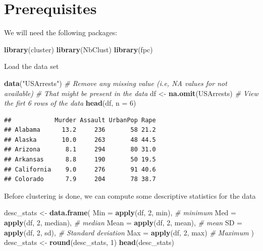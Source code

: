 \documentclass[
]{book}
\newenvironment{Shaded}{\begin{snugshade}}{\end{snugshade}}
\newcommand{\CommentTok}[1]{\textcolor[rgb]{0.56,0.35,0.01}{\textit{#1}}}
\newcommand{\DataTypeTok}[1]{\textcolor[rgb]{0.13,0.29,0.53}{#1}}
\newcommand{\DecValTok}[1]{\textcolor[rgb]{0.00,0.00,0.81}{#1}}
\newcommand{\KeywordTok}[1]{\textcolor[rgb]{0.13,0.29,0.53}{\textbf{#1}}}
\newcommand{\NormalTok}[1]{#1}
\newcommand{\StringTok}[1]{\textcolor[rgb]{0.31,0.60,0.02}{#1}}
\begin{document}
\hypertarget{prerequisites}{%
\section{Prerequisites}\label{prerequisites}}

We will need the following packages:

\begin{Shaded}
\begin{Highlighting}[]
\KeywordTok{library}\NormalTok{(cluster)}
\KeywordTok{library}\NormalTok{(NbClust)}
\KeywordTok{library}\NormalTok{(fpc)}
\end{Highlighting}
\end{Shaded}

Load the data set

\begin{Shaded}
\begin{Highlighting}[]
\KeywordTok{data}\NormalTok{(}\StringTok{"USArrests"}\NormalTok{)}
\CommentTok{# Remove any missing value (i.e, NA values for not available)}
\CommentTok{# That might be present in the data}
\NormalTok{df <-}\StringTok{ }\KeywordTok{na.omit}\NormalTok{(USArrests)}
\CommentTok{# View the firt 6 rows of the data}
\KeywordTok{head}\NormalTok{(df, }\DataTypeTok{n =} \DecValTok{6}\NormalTok{)}
\end{Highlighting}
\end{Shaded}

\begin{verbatim}
##            Murder Assault UrbanPop Rape
## Alabama      13.2     236       58 21.2
## Alaska       10.0     263       48 44.5
## Arizona       8.1     294       80 31.0
## Arkansas      8.8     190       50 19.5
## California    9.0     276       91 40.6
## Colorado      7.9     204       78 38.7
\end{verbatim}

Before clustering is done, we can compute some descriptive statistics for the data

\begin{Shaded}
\begin{Highlighting}[]
\NormalTok{desc_stats <-}\StringTok{ }\KeywordTok{data.frame}\NormalTok{(}
\DataTypeTok{Min =} \KeywordTok{apply}\NormalTok{(df, }\DecValTok{2}\NormalTok{, min), }\CommentTok{# minimum}
\DataTypeTok{Med =} \KeywordTok{apply}\NormalTok{(df, }\DecValTok{2}\NormalTok{, median), }\CommentTok{# median}
\DataTypeTok{Mean =} \KeywordTok{apply}\NormalTok{(df, }\DecValTok{2}\NormalTok{, mean), }\CommentTok{# mean}
\DataTypeTok{SD =} \KeywordTok{apply}\NormalTok{(df, }\DecValTok{2}\NormalTok{, sd), }\CommentTok{# Standard deviation}
\DataTypeTok{Max =} \KeywordTok{apply}\NormalTok{(df, }\DecValTok{2}\NormalTok{, max) }\CommentTok{# Maximum}
\NormalTok{)}
\NormalTok{desc_stats <-}\StringTok{ }\KeywordTok{round}\NormalTok{(desc_stats, }\DecValTok{1}\NormalTok{)}
\KeywordTok{head}\NormalTok{(desc_stats)}
\end{Highlighting}
\end{Shaded}
\end{document}
